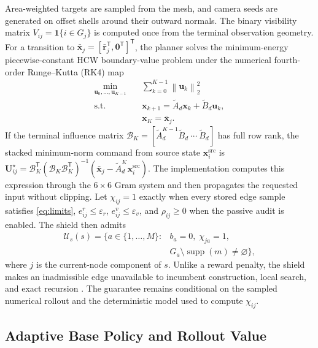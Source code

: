 \documentclass{IEEEtaes}
\newcommand{\norm}[1]{\left\lVert #1 \right\rVert}
\theoremstyle{remark}
\theoremstyle{plain}
\begin{document}
Area-weighted targets are sampled from the mesh, and camera seeds are generated on offset shells around their outward normals. The binary visibility matrix $V_{ij}=\mathbf 1\{i\in G_j\}$ is computed once from the terminal observation geometry. For a transition to $\bar{\mathbf x}_j=[\bar{\mathbf r}_j^{\mathsf T},\mathbf0^{\mathsf T}]^{\mathsf T}$, the planner solves the minimum-energy piecewise-constant HCW boundary-value problem under the numerical fourth-order Runge--Kutta (RK4) map
\begin{equation}
  \begin{aligned}
  \min_{\mathbf u_0,\ldots,\mathbf u_{K-1}}\quad&
  \sum_{k=0}^{K-1}\norm{\mathbf u_k}_2^2\\
  \mathrm{s.t.}\quad&
  \mathbf x_{k+1}=\widetilde A_d\mathbf x_k+\widetilde B_d\mathbf u_k,\\
  &\mathbf x_K=\bar{\mathbf x}_j.
  \end{aligned}
  \label{eq:terminal-transfer}
\end{equation}
If the terminal influence matrix $\mathcal B_K=[\widetilde A_d^{K-1}\widetilde B_d\ \cdots\ \widetilde B_d]$ has full row rank, the stacked minimum-norm command from source state $\mathbf x_i^{\mathrm{src}}$ is $\mathbf U_{ij}^\star=\mathcal B_K^{\mathsf T}(\mathcal B_K\mathcal B_K^{\mathsf T})^{-1}(\bar{\mathbf x}_j-\widetilde A_d^K\mathbf x_i^{\mathrm{src}})$. The implementation computes this expression through the $6\times6$ Gram system and then propagates the requested input without clipping. Let $\chi_{ij}=1$ exactly when every stored edge sample satisfies \eqref{eq:limits}, $e_{ij}^{r}\le\varepsilon_r$, $e_{ij}^{v}\le\varepsilon_v$, and $\rho_{ij}\ge0$ when the passive audit is enabled. The shield then admits
\begin{equation}
  \begin{split}
  \mathcal U_s(s)=\{a\in\{1,\ldots,M\}:{}& b_a=0,\;\chi_{ja}=1,\\
    &G_a\setminus\operatorname{supp}(m)\neq\varnothing\},
  \end{split}
  \label{eq:safe-action-set}
\end{equation}
where $j$ is the current-node component of $s$. Unlike a reward penalty, the shield makes an inadmissible edge unavailable to incumbent construction, local search, and exact recursion \cite{alshiekh2018shielding}. The guarantee remains conditional on the sampled numerical rollout and the deterministic model used to compute $\chi_{ij}$.

\subsection{Adaptive Base Policy and Rollout Value}
\end{document}
